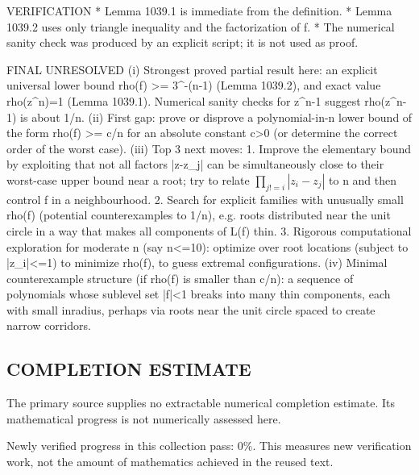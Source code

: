 VERIFICATION
* Lemma 1039.1 is immediate from the definition.
* Lemma 1039.2 uses only triangle inequality and the factorization of f.
* The numerical sanity check was produced by an explicit script; it is not used as proof.

FINAL
UNRESOLVED
(i) Strongest proved partial result here: an explicit universal lower bound rho(f) >= 3^{-(n-1)} (Lemma 1039.2), and exact value rho(z^n)=1 (Lemma 1039.1). Numerical sanity checks for z^n-1 suggest rho(z^n-1) is about 1/n.
(ii) First gap: prove or disprove a polynomial-in-n lower bound of the form rho(f) >= c/n for an absolute constant c>0 (or determine the correct order of the worst case).
(iii) Top 3 next moves:
  1. Improve the elementary bound by exploiting that not all factors |z-z_j| can be simultaneously close to their worst-case upper bound near a root; try to relate \(\prod_{j!=i} |z_i-z_j|\) to n and then control f in a neighbourhood.
  2. Search for explicit families with unusually small rho(f) (potential counterexamples to 1/n), e.g. roots distributed near the unit circle in a way that makes all components of L(f) thin.
  3. Rigorous computational exploration for moderate n (say n<=10): optimize over root locations (subject to |z_i|<=1) to minimize rho(f), to guess extremal configurations.
(iv) Minimal counterexample structure (if rho(f) is smaller than c/n): a sequence of polynomials whose sublevel set |f|<1 breaks into many thin components, each with small inradius, perhaps via roots near the unit circle spaced to create narrow corridors.



\subsection*{COMPLETION ESTIMATE}
The primary source supplies no extractable numerical completion estimate. Its mathematical progress is not numerically assessed here.

Newly verified progress in this collection pass: $0\%$. This measures new verification work, not the amount of mathematics achieved in the reused text.
